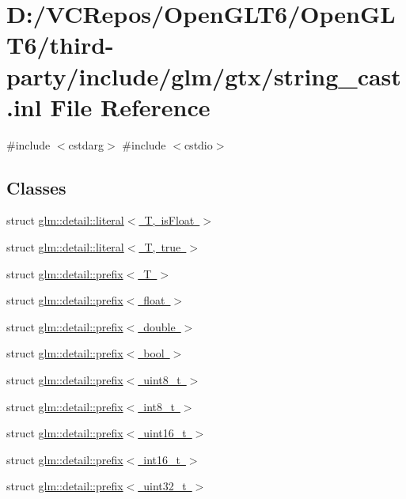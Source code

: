 \hypertarget{string__cast_8inl}{}\section{D\+:/\+V\+C\+Repos/\+Open\+G\+L\+T6/\+Open\+G\+L\+T6/third-\/party/include/glm/gtx/string\+\_\+cast.inl File Reference}
\label{string__cast_8inl}
{\ttfamily \#include $<$cstdarg$>$}\newline
{\ttfamily \#include $<$cstdio$>$}\newline
\subsection*{Classes}
\begin{DoxyCompactItemize}
\item 
struct \mbox{\hyperlink{structglm_1_1detail_1_1literal}{glm\+::detail\+::literal$<$ T, is\+Float $>$}}
\item 
struct \mbox{\hyperlink{structglm_1_1detail_1_1literal_3_01_t_00_01true_01_4}{glm\+::detail\+::literal$<$ T, true $>$}}
\item 
struct \mbox{\hyperlink{structglm_1_1detail_1_1prefix}{glm\+::detail\+::prefix$<$ T $>$}}
\item 
struct \mbox{\hyperlink{structglm_1_1detail_1_1prefix_3_01float_01_4}{glm\+::detail\+::prefix$<$ float $>$}}
\item 
struct \mbox{\hyperlink{structglm_1_1detail_1_1prefix_3_01double_01_4}{glm\+::detail\+::prefix$<$ double $>$}}
\item 
struct \mbox{\hyperlink{structglm_1_1detail_1_1prefix_3_01bool_01_4}{glm\+::detail\+::prefix$<$ bool $>$}}
\item 
struct \mbox{\hyperlink{structglm_1_1detail_1_1prefix_3_01uint8__t_01_4}{glm\+::detail\+::prefix$<$ uint8\+\_\+t $>$}}
\item 
struct \mbox{\hyperlink{structglm_1_1detail_1_1prefix_3_01int8__t_01_4}{glm\+::detail\+::prefix$<$ int8\+\_\+t $>$}}
\item 
struct \mbox{\hyperlink{structglm_1_1detail_1_1prefix_3_01uint16__t_01_4}{glm\+::detail\+::prefix$<$ uint16\+\_\+t $>$}}
\item 
struct \mbox{\hyperlink{structglm_1_1detail_1_1prefix_3_01int16__t_01_4}{glm\+::detail\+::prefix$<$ int16\+\_\+t $>$}}
\item 
struct \mbox{\hyperlink{structglm_1_1detail_1_1prefix_3_01uint32__t_01_4}{glm\+::detail\+::prefix$<$ uint32\+\_\+t $>$}}

\end{DoxyCompactItemize}
